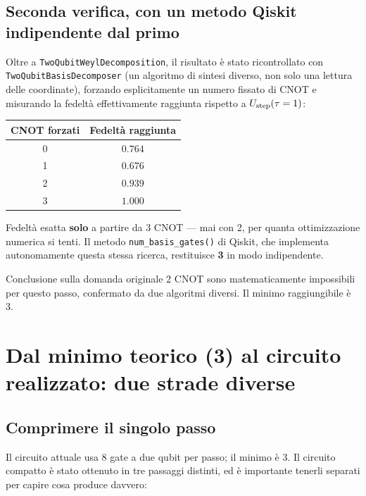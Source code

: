 \documentclass[11pt,a4paper]{article}
\begin{document}
\subsection*{Seconda verifica, con un metodo Qiskit indipendente dal primo}

Oltre a \texttt{TwoQubitWeylDecomposition}, il risultato è stato
ricontrollato con \texttt{TwoQubitBasisDecomposer} (un algoritmo di
sintesi diverso, non solo una lettura delle coordinate), forzando
esplicitamente un numero fissato di CNOT e misurando la fedeltà
effettivamente raggiunta rispetto a $U_{\rm step}(\tau=1)$:

\begin{center}
\renewcommand{\arraystretch}{1.25}
\begin{tabular}{@{}cc@{}}
\toprule
\rowcolor{inkblue!10}
\textbf{CNOT forzati} & \textbf{Fedeltà raggiunta}\\
\midrule
0 & $0.764$\\
1 & $0.676$\\
2 & $0.939$\\
3 & $1.000$\\
\bottomrule
\end{tabular}
\end{center}

Fedeltà esatta \textbf{solo} a partire da 3 CNOT --- mai con 2, per
quanta ottimizzazione numerica si tenti. Il metodo
\texttt{num\_basis\_gates()} di Qiskit, che implementa autonomamente
questa stessa ricerca, restituisce \textbf{3} in modo indipendente.

\begin{okbox}{Conclusione sulla domanda originale}
2 CNOT sono matematicamente impossibili per questo passo, confermato
da due algoritmi diversi. Il minimo raggiungibile è 3.
\end{okbox}

\section{Dal minimo teorico (3) al circuito realizzato: due strade diverse}

\subsection*{Comprimere il singolo passo}

Il circuito attuale usa 8 gate a due qubit per passo; il minimo è 3.
Il circuito compatto è stato ottenuto in tre passaggi distinti, ed è
importante tenerli separati per capire cosa produce davvero:
\end{document}
